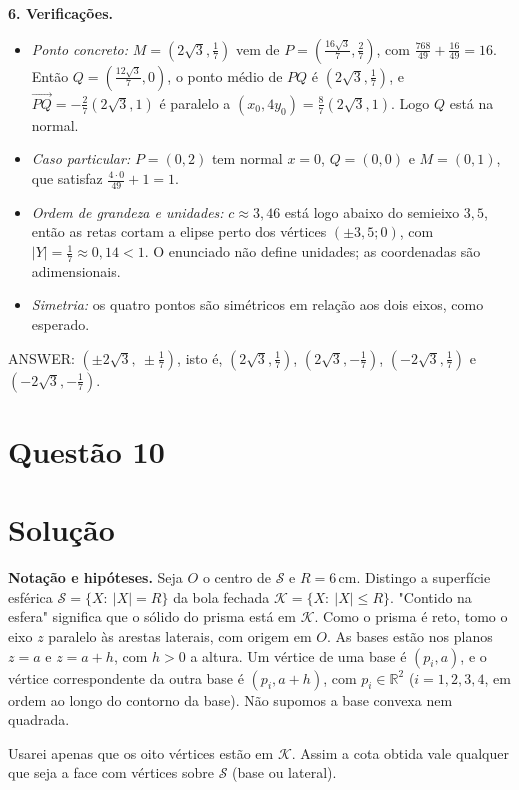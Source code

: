 \documentclass{article}%
\begin{document}
\textbf{6. Verificações.}
\begin{itemize}
\item \emph{Ponto concreto:} $M=\left(2\sqrt3,\frac17\right)$ vem de $P=\left(\frac{16\sqrt3}{7},\frac27\right)$, com $\frac{768}{49}+\frac{16}{49}=16$. Então $Q=\left(\frac{12\sqrt3}{7},0\right)$, o ponto médio de $PQ$ é $\left(2\sqrt3,\frac17\right)$, e $\overrightarrow{PQ}=-\frac{2}{7}(2\sqrt3,1)$ é paralelo a $(x_0,4y_0)=\frac{8}{7}(2\sqrt3,1)$. Logo $Q$ está na normal.
\item \emph{Caso particular:} $P=(0,2)$ tem normal $x=0$, $Q=(0,0)$ e $M=(0,1)$, que satisfaz $\frac{4\cdot 0}{49}+1=1$.
\item \emph{Ordem de grandeza e unidades:} $c\approx 3{,}46$ está logo abaixo do semieixo $3{,}5$, então as retas cortam a elipse perto dos vértices $(\pm 3{,}5;0)$, com $|Y|=\frac17\approx 0{,}14<1$. O enunciado não define unidades; as coordenadas são adimensionais.
\item \emph{Simetria:} os quatro pontos são simétricos em relação aos dois eixos, como esperado.
\end{itemize}

ANSWER: $\left(\pm 2\sqrt{3},\ \pm\frac{1}{7}\right)$, isto é, $\left(2\sqrt{3},\frac{1}{7}\right)$, $\left(2\sqrt{3},-\frac{1}{7}\right)$, $\left(-2\sqrt{3},\frac{1}{7}\right)$ e $\left(-2\sqrt{3},-\frac{1}{7}\right)$.%
\newpage%
\section*{Questão 10}

\section*{Solução}

\textbf{Notação e hipóteses.} Seja $O$ o centro de $\mathcal{S}$ e $R=6\,\text{cm}$. Distingo a superfície esférica $\mathcal{S}=\{X:\ |X|=R\}$ da bola fechada $\mathcal{K}=\{X:\ |X|\le R\}$. "Contido na esfera" significa que o sólido do prisma está em $\mathcal{K}$. Como o prisma é reto, tomo o eixo $z$ paralelo às arestas laterais, com origem em $O$. As bases estão nos planos $z=a$ e $z=a+h$, com $h>0$ a altura. Um vértice de uma base é $(p_i,a)$, e o vértice correspondente da outra base é $(p_i,a+h)$, com $p_i\in\mathbb{R}^2$ ($i=1,2,3,4$, em ordem ao longo do contorno da base). Não supomos a base convexa nem quadrada.

Usarei apenas que os oito vértices estão em $\mathcal{K}$. Assim a cota obtida vale qualquer que seja a face com vértices sobre $\mathcal{S}$ (base ou lateral).
\end{document}
